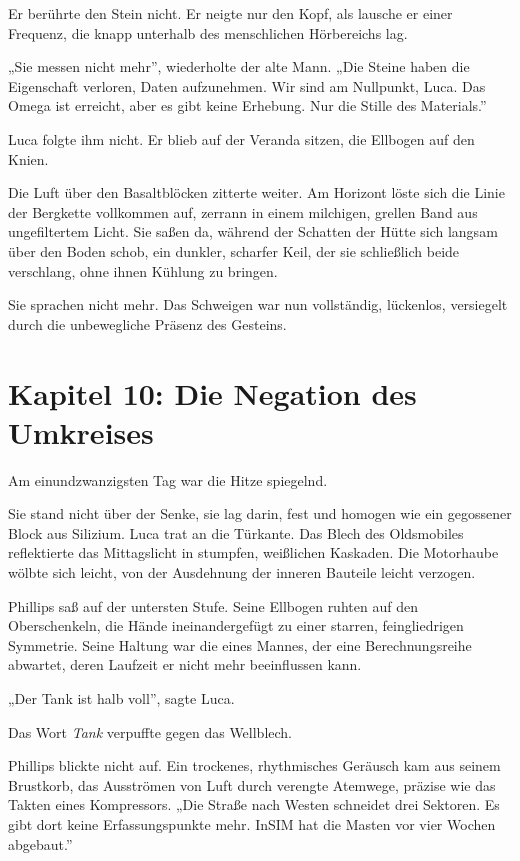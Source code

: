 \documentclass[
  ngerman,
]{article}
\begin{document}
Er berührte den Stein nicht. Er neigte nur den Kopf, als lausche er
einer Frequenz, die knapp unterhalb des menschlichen Hörbereichs lag.

„Sie messen nicht mehr'', wiederholte der alte Mann. „Die Steine haben
die Eigenschaft verloren, Daten aufzunehmen. Wir sind am Nullpunkt,
Luca. Das Omega ist erreicht, aber es gibt keine Erhebung. Nur die
Stille des Materials.''

Luca folgte ihm nicht. Er blieb auf der Veranda sitzen, die Ellbogen auf
den Knien.

Die Luft über den Basaltblöcken zitterte weiter. Am Horizont löste sich
die Linie der Bergkette vollkommen auf, zerrann in einem milchigen,
grellen Band aus ungefiltertem Licht. Sie saßen da, während der Schatten
der Hütte sich langsam über den Boden schob, ein dunkler, scharfer Keil,
der sie schließlich beide verschlang, ohne ihnen Kühlung zu bringen.

Sie sprachen nicht mehr. Das Schweigen war nun vollständig, lückenlos,
versiegelt durch die unbewegliche Präsenz des Gesteins.

\section{\texorpdfstring{\textbf{Kapitel 10: Die Negation des
Umkreises}}{Kapitel 10: Die Negation des Umkreises}}\label{kapitel-10-die-negation-des-umkreises}

Am einundzwanzigsten Tag war die Hitze spiegelnd.

Sie stand nicht über der Senke, sie lag darin, fest und homogen wie ein
gegossener Block aus Silizium. Luca trat an die Türkante. Das Blech des
Oldsmobiles reflektierte das Mittagslicht in stumpfen, weißlichen
Kaskaden. Die Motorhaube wölbte sich leicht, von der Ausdehnung der
inneren Bauteile leicht verzogen.

Phillips saß auf der untersten Stufe. Seine Ellbogen ruhten auf den
Oberschenkeln, die Hände ineinandergefügt zu einer starren,
feingliedrigen Symmetrie. Seine Haltung war die eines Mannes, der eine
Berechnungsreihe abwartet, deren Laufzeit er nicht mehr beeinflussen
kann.

„Der Tank ist halb voll'', sagte Luca.

Das Wort \emph{Tank} verpuffte gegen das Wellblech.

Phillips blickte nicht auf. Ein trockenes, rhythmisches Geräusch kam aus
seinem Brustkorb, das Ausströmen von Luft durch verengte Atemwege,
präzise wie das Takten eines Kompressors. „Die Straße nach Westen
schneidet drei Sektoren. Es gibt dort keine Erfassungspunkte mehr. InSIM
hat die Masten vor vier Wochen abgebaut.''
\end{document}
